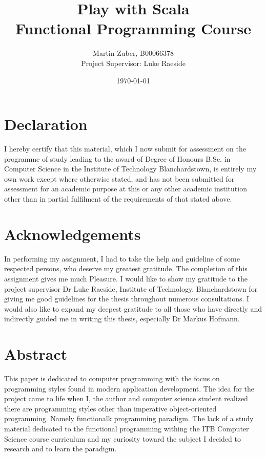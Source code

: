 \documentclass[12pt,twoside,a4paper]{report}
\title{Play with Scala\\Functional Programming Course}
\author{Martin Zuber, B00066378 \\ Project Supervisor:  Luke Raeside}
\date{\today}
\begin{document}
\maketitle
\newpage








\chapter*{Declaration}
I hereby certify that this material, which I now submit for assessment on the programme of study leading to the award of Degree of Honours B.Sc. in Computer Science in the Institute of Technology Blanchardstown, is entirely my own work except where otherwise stated, and has not been submitted for assessment for an academic purpose at this or any other academic institution other than in partial fulfilment of the requirements of that stated above.









\chapter*{Acknowledgements}
In performing my assignment, I had to take the help and guideline of some respected persons, who deserve my greatest gratitude. The completion of this assignment gives me much Pleasure. I would like to show my gratitude to the project supervisor Dr Luke Raeside, Institute of Technology, Blanchardstown for giving me good guidelines for the thesis throughout numerous consultations. I would also like to expand my deepest gratitude to all those who have directly and indirectly guided me in writing this thesis, especially Dr Markus Hofmann.








\chapter*{Abstract}
This paper is dedicated to computer programming with the focus on programming styles found in modern application development. The idea for the project came to life when I, the author and computer science student realized there are programming styles other than imperative object-oriented programming. Namely functionalk programming paradigm. The lack of a study material dedicated to the functional programming withing the ITB Computer Science course curriculum and my curiosity toward the subject I decided to research and to learn the paradigm.
\end{document}
